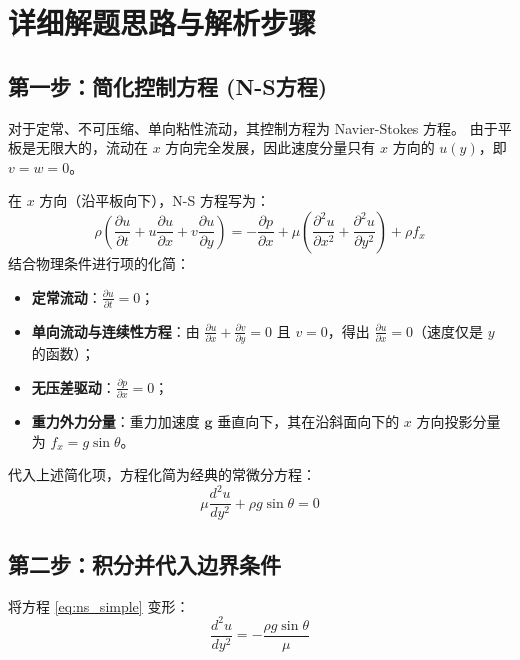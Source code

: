 \documentclass[11pt,a4paper]{article}
\begin{document}
\newpage

\section{详细解题思路与解析步骤}

\subsection{第一步：简化控制方程 (N-S方程)}
对于定常、不可压缩、单向粘性流动，其控制方程为 Navier-Stokes 方程。
由于平板是无限大的，流动在 $x$ 方向完全发展，因此速度分量只有 $x$ 方向的 $u(y)$，即 $v = w = 0$。

在 $x$ 方向（沿平板向下），N-S 方程写为：
\begin{equation}
    \rho \left( \frac{\partial u}{\partial t} + u \frac{\partial u}{\partial x} + v \frac{\partial u}{\partial y} \right) = -\frac{\partial p}{\partial x} + \mu \left( \frac{\partial^2 u}{\partial x^2} + \frac{\partial^2 u}{\partial y^2} \right) + \rho f_x
\end{equation}
结合物理条件进行项的化简：
\begin{itemize}
    \item \textbf{定常流动}：$\frac{\partial u}{\partial t} = 0$；
    \item \textbf{单向流动与连续性方程}：由 $\frac{\partial u}{\partial x} + \frac{\partial v}{\partial y} = 0$ 且 $v=0$，得出 $\frac{\partial u}{\partial x} = 0$（速度仅是 $y$ 的函数）；
    \item \textbf{无压差驱动}：$\frac{\partial p}{\partial x} = 0$；
    \item \textbf{重力外力分量}：重力加速度 $\bm{g}$ 垂直向下，其在沿斜面向下的 $x$ 方向投影分量为 $f_x = g \sin\theta$。
\end{itemize}

代入上述简化项，方程化简为经典的常微分方程：
\begin{equation}
    \mu \frac{d^2u}{dy^2} + \rho g \sin\theta = 0
    \label{eq:ns_simple}
\end{equation}

\subsection{第二步：积分并代入边界条件}
将方程 \eqref{eq:ns_simple} 变形：
\begin{equation}
    \frac{d^2u}{dy^2} = -\frac{\rho g \sin\theta}{\mu}
\end{equation}
\end{document}
